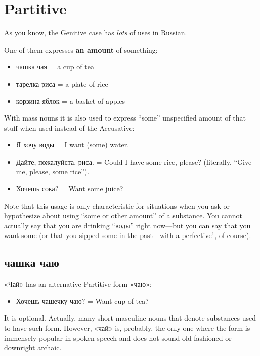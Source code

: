 \chapter{Partitive}\label{partitive}

As you know, the Genitive case has \emph{lots} of uses in Russian.

One of them expresses \textbf{an amount} of something:

\begin{itemize}
\tightlist
\item
  чашка чая = a cup of tea
\item
  тарелка риса = a plate of rice
\item
  корзина яблок = a basket of apples
\end{itemize}

With mass nouns it is also used to express ``some'' unspecified amount
of that stuff when used instead of the Accusative:

\begin{itemize}
\tightlist
\item
  Я хочу воды = I want (some) water.
\item
  Дайте, пожалуйста, риса. = Could I have some rice, please? (literally,
  ``Give me, please, some rice'').
\item
  Хочешь сока? = Want some juice?
\end{itemize}

Note that this usage is only characteristic for situations when you ask
or hypothesize about using ``some or other amount'' of a substance. You
cannot actually say that you are drinking ``воды'' right now---but you
can say that you want some (or that you sipped some in the past---with a
perfective$^1$, of course).

\section{чашка
чаю}\label{ux447ux430ux448ux43aux430-ux447ux430ux44e}

«Чай» has an alternative Partitive form «чаю»:

\begin{itemize}
\tightlist
\item
  Хочешь чашечку чаю? = Want cup of tea?
\end{itemize}

It is optional. Actually, many short masculine nouns that denote
substances used to have such form. However, «чай» is, probably, the only
one where the form is immensely popular in spoken speech and does not
sound old-fashioned or downright archaic.

